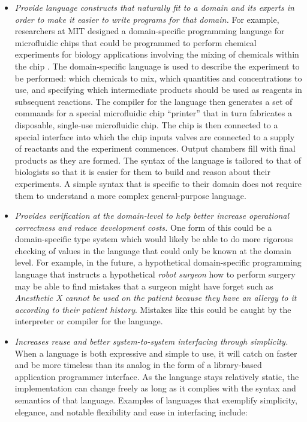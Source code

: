 \begin{itemize}
\item \textit{Provide language constructs that naturally fit to a domain and its experts in order to make it easier to write programs for that domain.} For example, researchers at MIT designed a domain-specific programming language for microfluidic chips that could be programmed to perform chemical experiments for biology applications involving the mixing of chemicals within the chip \citep{thies:microfluidic}. The domain-specific language is used to describe the experiment to be performed: which chemicals to mix, which quantities and concentrations to use, and specifying which intermediate products should be used as reagents in subsequent reactions. The compiler for the language then generates a set of commands for a special microfluidic chip ``printer'' that in turn fabricates a disposable, single-use microfluidic chip. The chip is then connected to a special interface into which the chip inputs valves are connected to a supply of reactants and the experiment commences. Output chambers fill with final products as they are formed. The syntax of the language is tailored to that of biologists so that it is easier for them to build and reason about their experiments. A simple syntax that is specific to their domain does not require them to understand a more complex general-purpose language.
\item \textit{Provides verification at the domain-level to help better increase operational correctness and reduce development costs.} One form of this could be a domain-specific type system which would likely be able to do more rigorous checking of values in the language that could only be known at the domain level. For example, in the future, a hypothetical domain-specific programming language that instructs a hypothetical \textit{robot surgeon} how to perform surgery may be able to find mistakes that a surgeon might have forget such as \textit{Anesthetic X cannot be used on the patient because they have an allergy to it according to their patient history}. Mistakes like this could be caught by the interpreter or compiler for the language.
\item \textit{Increases reuse and better system-to-system interfacing through simplicity.} When a language is both expressive and simple to use, it will catch on faster and be more timeless than its analog in the form of a library-based application programmer interface. As the language stays relatively static, the implementation can change freely as long as it complies with the syntax and semantics of that language. Examples of languages that exemplify simplicity, elegance, and notable flexibility and ease in interfacing include:

\end{itemize}
